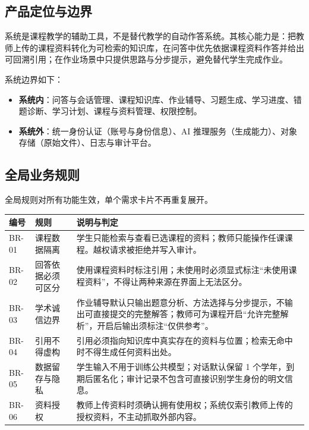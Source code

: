 \documentclass[12pt,a4paper]{ctexart}
\begin{document}
\subsection{产品定位与边界}

系统是课程教学的辅助工具，不是替代教学的自动作答系统。其核心能力是：把教师上传的课程资料转化为可检索的知识库，在问答中优先依据课程资料作答并给出可回溯引用；在作业场景中只提供思路与分步提示，避免替代学生完成作业。

系统边界如下：

\begin{itemize}
  \item \textbf{系统内}：问答与会话管理、课程知识库、作业辅导、习题生成、学习进度、错题诊断、学习计划、课程与资料管理、权限控制。
  \item \textbf{系统外}：统一身份认证（账号与身份信息）、AI 推理服务（生成能力）、对象存储（原始文件）、日志与审计平台。
\end{itemize}

\subsection{全局业务规则}

全局规则对所有功能生效，单个需求卡片不再重复展开。

\begin{longtable}{@{}L{1.6cm}L{5.2cm}L{8.2cm}@{}}
  \toprule
  \textbf{编号} & \textbf{规则} & \textbf{说明与判定} \\
  \midrule
  \endhead
  BR-01 & 课程数据隔离 & 学生只能检索与查看已选课程的资料；教师只能操作任课课程。越权请求被拒绝并写入审计。 \\
  BR-02 & 回答依据必须可区分 & 使用课程资料时标注引用；未使用时必须显式标注“未使用课程资料”，不得让两种来源在界面上无法区分。 \\
  BR-03 & 学术诚信边界 & 作业辅导默认只输出题意分析、方法选择与分步提示，不输出可直接提交的完整解答；教师可为课程开启“允许完整解析”，开启后输出须标注“仅供参考”。 \\
  BR-04 & 引用不得虚构 & 引用必须指向知识库中真实存在的资料与位置；检索无命中时不得生成任何资料出处。 \\
  BR-05 & 数据留存与隐私 & 学生输入不用于训练公共模型；对话默认保留 1 个学年，到期后匿名化；审计记录不包含可直接识别学生身份的明文信息。 \\
  BR-06 & 资料授权 & 教师上传资料时须确认拥有使用权；系统仅索引教师上传的授权资料，不主动抓取外部内容。 \\
  \bottomrule
\end{longtable}
\end{document}
